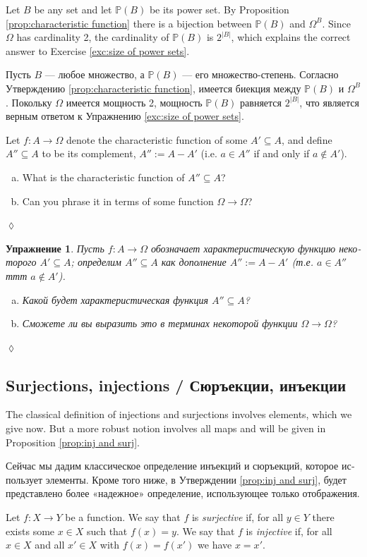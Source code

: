 \documentclass[a4paper]{book}
\def\PP{{\mathbb P}}
\def\to{\rightarrow}
\def\taking{\colon}
\def\ss{\subseteq}
\theoremstyle{myth}
\newtheorem{excENG}[envENG]{\begin{english}Exercise\end{english}}
\newtheorem{definitionENG}[envENG]{\begin{english}Definition\end{english}}
\newenvironment{exerciseENG}{\begin{excENG}}{\hspace*{\fill}$\lozenge$\end{excENG}}
\newtheorem{excRUS}[envRUS]{Упражнение}
\newenvironment{exerciseRUS}{\begin{excRUS}}{\hspace*{\fill}$\lozenge$\end{excRUS}}
\def\sexc{\begin{enumerate}[a.)]\setlength{\itemsep}{.1cm}\setlength{\parskip}{.1cm}\item}
\def\next{\item}
\def\endsexc{\end{enumerate}}
\begin{document}
\begin{russian}
Let $B$ be any set and let $\PP(B)$ be its power set. By Proposition \ref{prop:characteristic function} there is a bijection between $\PP(B)$ and $\Omega^B$. Since $\Omega$ has cardinality 2, the cardinality of $\PP(B)$ is $2^{|B|}$, which explains the correct answer to Exercise \ref{exc:size of power sets}.

Пусть $B$ — любое множество, а $\PP(B)$ — его множество-степень. Согласно Утверждению \ref{prop:characteristic function}, имеется биекция между $\PP(B)$ и $\Omega^B$. Покольку $\Omega$ имеется мощность 2, мощность $\PP(B)$ равняется $2^{|B|}$, что является верным ответом к Упражнению \ref{exc:size of power sets}.

\begin{exerciseENG}
Let $f\taking A\to\Omega$ denote the characteristic function of some $A'\ss A$, and define $A''\ss A$ to be its complement, $A'':=A-A'$ (i.e. $a\in A''$ if and only if $a\not\in A'$). 
\sexc What is the characteristic function of $A''\ss A$? 
\next Can you phrase it in terms of some function $\Omega\to\Omega$?
\endsexc
\end{exerciseENG}

\begin{exerciseRUS}
Пусть $f\taking A\to\Omega$ обозначает характеристическую функцию некоторого $A'\ss A$; определим $A''\ss A$ как дополнение $A'':=A-A'$ (т.е. $a\in A''$ ттт $a\not\in A'$). 
\sexc Какой будет характеристическая функция $A''\ss A$? 
\next Сможете ли вы выразить это в терминах некоторой функции $\Omega\to\Omega$?
\endsexc
\end{exerciseRUS}


\subsection{Surjections, injections / Сюръекции, инъекции}

The classical definition of injections and surjections involves elements, which we give now. But a more robust notion involves all maps and will be given in Proposition \ref{prop:inj and surj}.

Сейчас мы дадим классическое определение инъекций и сюръекций, которое использует элементы. Кроме того ниже, в Утверждении \ref{prop:inj and surj}, будет представлено более «надежное» определение, использующее только отображения.

\begin{definitionENG}\label{def:inj,surj,bij}
Let $f\taking X\to Y$ be a function. We say that $f$ is {\em surjective} if, for all $y\in Y$ there exists some $x\in X$ such that $f(x)=y$. We say that $f$ is {\em injective} if, for all $x\in X$ and all $x'\in X$ with $f(x)=f(x')$ we have $x=x'$.


\end{definitionENG}
\end{russian}
\end{document}
